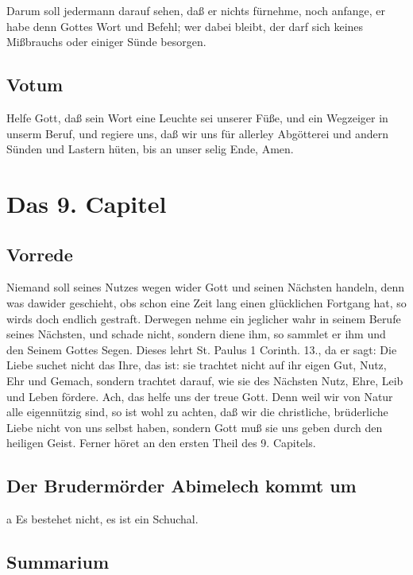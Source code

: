 Darum soll jedermann darauf sehen, daß er nichts fürnehme, noch anfange, er habe denn Gottes Wort und Befehl; wer dabei bleibt, der darf sich keines Mißbrauchs oder einiger Sünde besorgen.

\section{Votum}

Helfe Gott, daß sein Wort eine Leuchte sei unserer Füße, und ein Wegzeiger in unserm Beruf, und regiere uns, daß wir uns für allerley Abgötterei und andern Sünden und Lastern hüten, bis an unser selig Ende, Amen.

\chapter{Das 9. Capitel}

\section{Vorrede}

Niemand soll seines Nutzes wegen wider Gott und seinen Nächsten handeln, denn was dawider geschieht, obs schon eine Zeit lang einen glücklichen Fortgang hat, so wirds doch endlich gestraft. Derwegen nehme ein jeglicher wahr in seinem Berufe seines Nächsten, und schade nicht, sondern diene ihm, so sammlet er ihm und den Seinem Gottes Segen. Dieses lehrt St. Paulus 1 Corinth. 13., da er sagt: Die Liebe suchet nicht das Ihre, das ist: sie trachtet nicht auf ihr eigen Gut, Nutz, Ehr und Gemach, sondern trachtet darauf, wie sie des Nächsten Nutz, Ehre, Leib und Leben fördere. Ach, das helfe uns der treue Gott. Denn weil wir von Natur alle eigennützig sind, so ist wohl zu achten, daß wir die christliche, brüderliche Liebe nicht von uns selbst haben, sondern Gott muß sie uns geben durch den heiligen Geist. Ferner höret an den ersten Theil des 9. Capitels.

\section{Der Brudermörder Abimelech kommt um}
a Es bestehet nicht, es ist ein Schuchal.

\section{Summarium}

